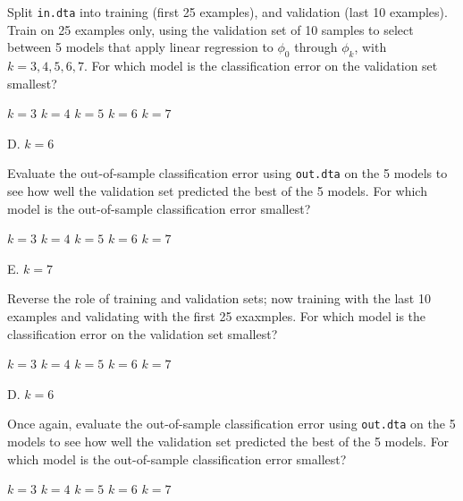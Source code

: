 \documentclass[answers]{exam}
\begin{document}
\begin{questions}
\question Split \verb|in.dta| into training (first 25 examples), and validation
(last 10 examples). Train on 25 examples only, using the validation set of 10 
samples to select between 5 models that apply linear regression to $\phi_0$ 
through $\phi_{k}$, with $k=3,4,5,6,7$. For which model is the classification 
error on the validation set smallest?

\begin{choices}
\choice $k=3$
\choice $k=4$
\choice $k=5$
\choice $k=6$
\choice $k=7$
\end{choices}

\begin{solution}
D. $k=6$
\end{solution}

\question Evaluate the out-of-sample classification error using \verb|out.dta|
on the 5 models to see how well the validation set predicted the best of the 
5 models. For which model is the out-of-sample classification error smallest?

\begin{choices}
\choice $k=3$
\choice $k=4$
\choice $k=5$
\choice $k=6$
\choice $k=7$
\end{choices}

\begin{solution}
E. $k=7$
\end{solution}

\question Reverse the role of training and validation sets; now training with
the last 10 examples and validating with the first 25 exaxmples. For which model
is the classification error on the validation set smallest?

\begin{choices}
\choice $k=3$
\choice $k=4$
\choice $k=5$
\choice $k=6$
\choice $k=7$
\end{choices}

\begin{solution}
D. $k=6$
\end{solution}

\question Once again, evaluate the out-of-sample classification error using 
\verb|out.dta| on the 5 models to see how well the validation set predicted 
the best of the 5 models. For which model is the out-of-sample classification 
error smallest?

\begin{choices}
\choice $k=3$
\choice $k=4$
\choice $k=5$
\choice $k=6$
\choice $k=7$
\end{choices}


\end{questions}
\end{document}
